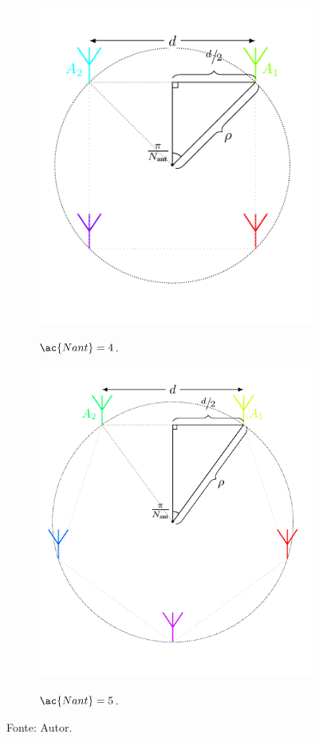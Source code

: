 \begin{figure}[htbp]
    \vspace{\floatsep}

    \hfill
    \begin{subfigure}[c]{0.425\textwidth}
        \centering
        \caption{$ \ac{Nant} = 4 $.}
        \includegraphics{../pictures/antennas_4.pdf}
        \label{fig:antennas:4}
    \end{subfigure}
    \hfill
    \begin{subfigure}[c]{0.525\textwidth}
        \centering
        \caption{$ \ac{Nant} = 5 $.}
        \includegraphics{../pictures/antennas_5.pdf}
        \label{fig:antennas:5}
    \end{subfigure}
    \hfill

    \caption*{Fonte: Autor.}
\end{figure}

